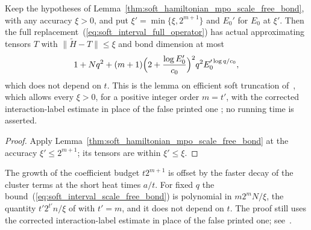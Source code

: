 \begin{lemma}
    \label{thm:soft_hamiltonian_mpo_every_accuracy}
    \leanok
    Keep the hypotheses of
    Lemma~\ref{thm:soft_hamiltonian_mpo_scale_free_bond}, with any accuracy
    $\xi>0$, and put $\xi'=\min\{\xi,2^{m+1}\}$ and $E_0'$ for $E_0$ at $\xi'$.
    Then the full replacement~(\ref{eq:soft_interval_full_operator}) has
    actual approximating tensors $T$ with $\|\widetilde H-T\|\leq\xi$ and bond
    dimension at most
    \begin{align}
        1+Nq^2+(m+1)\Bigl(2+\frac{\log E_0'}{c_0}\Bigr)^2q^2E_0'^{\log q/c_0},
        \label{eq:soft_interval_every_accuracy_bond}
    \end{align}
    which does not depend on $t$. This is the lemma on efficient soft
    truncation of~\cite[lines 1262--1268]{Arad2016RigorousRG}, which allows
    every $\xi>0$, for a positive integer order $m=t'$, with the corrected
    interaction-label estimate in place of the false printed one
    \cite{gap:alvv16_cluster_approximation}; no running time is asserted.
\end{lemma}
\begin{proof}\leanok
    Apply Lemma~\ref{thm:soft_hamiltonian_mpo_scale_free_bond} at the accuracy
    $\xi'\leq2^{m+1}$; its tensors are within $\xi'\leq\xi$.
\end{proof}

The growth of the coefficient budget $t2^{m+1}$ is offset by the faster
decay of the cluster terms at the short heat times $a/t$. For fixed $q$ the
bound~(\ref{eq:soft_interval_scale_free_bond}) is polynomial in
$m2^mN/\xi$, the quantity $t'2^{t'}n/\xi$ of
\cite[Lemma on efficient soft truncation, lines 1262--1268]{Arad2016RigorousRG}
with $t'=m$, and it does not depend on $t$. The proof still uses the
corrected interaction-label estimate in place of the false printed one;
see~\cite{gap:alvv16_cluster_approximation}.
